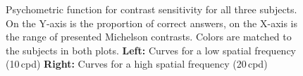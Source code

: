 \begin{figure}[H]
    \centering
    
    \caption[Contrast sensitivity]{Psychometric function for contrast sensitivity for all three subjects. On the Y-axis is the proportion of correct answers, on the X-axis is the range of presented Michelson contrasts. Colors are matched to the subjects in both plots. \textbf{Left:} Curves for a low spatial frequency (10\,cpd) \textbf{Right:} Curves for a high spatial frequency (20\,cpd)}
    \label{fig:contrast_sensitivity}
\end{figure}

